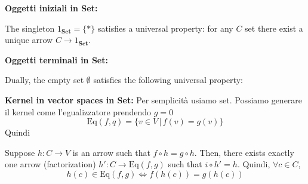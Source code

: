 \documentclass[a4paper]{article}
\begin{document}
\newcommand{\invPi}{\rotatebox[origin=c]{180}{$\pi$}}

\textbf{Oggetti iniziali in Set:}

The singleton \(1_\mathbf{Set} = \{\ast\}\) satisfies a universal property:
for any \(C\) set there exist a unique arrow \(C \to 1_\mathbf{Set}\).
\begin{center}
\end{center}

\textbf{Oggetti terminali in Set:}

Dually, the empty set \(\emptyset\) satisfies the following universal property:
\begin{center}
\end{center}

\textbf{Kernel in vector spaces in Set:}
Per semplicità usiamo set.
Possiamo generare il kernel come l'egualizzatore prendendo \(g=0\)
\[
    \text{Eq}(f,q) = \{v \in V \,|\, f(v) = g(v)\}
\]
Quindi 
Suppose \(h \colon C \to V\)
is an arrow such that \(f \circ h = g \circ h\).
Then, there exists exactly one arrow (factorization)
\(h' \colon C \to \text{Eq}(f,g)\)
such that \(i \circ h' = h\).
Quindi, \(\forall c \in C\),
\[
    h(c) \in \text{Eq}(f,g) \iff f(h(c)) = g(h(c))
\]
\end{document}
